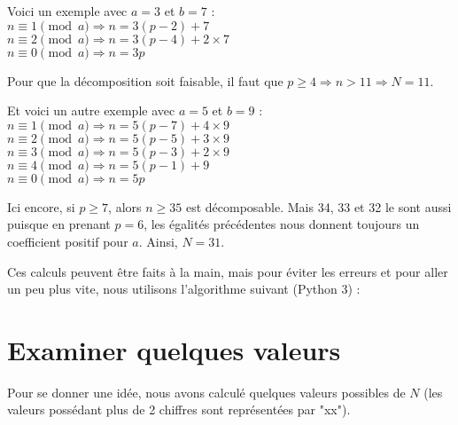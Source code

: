 \documentclass[11pt]{article}
\begin{document}
Voici un exemple avec $a = 3$ et $b = 7$ :\\
$n \equiv 1 \pmod a \Rightarrow n = 3(p - 2) + 7$ \\
$n \equiv 2 \pmod a \Rightarrow n = 3(p - 4) + 2\times 7$ \\
$n \equiv 0 \pmod a \Rightarrow n = 3p$ 

Pour que la décomposition soit faisable, il faut que $p \geq 4 \Rightarrow n > 11 \Rightarrow N = 11$.


Et voici un autre exemple avec $a = 5$ et $b = 9$ : \\
$n \equiv 1 \pmod a \Rightarrow n = 5(p - 7) + 4\times 9$ \\
$n \equiv 2 \pmod a \Rightarrow n = 5(p - 5) + 3\times 9$ \\
$n \equiv 3 \pmod a \Rightarrow n = 5(p - 3) + 2\times 9$ \\
$n \equiv 4 \pmod a \Rightarrow n = 5(p - 1) + 9$ \\
$n \equiv 0 \pmod a \Rightarrow n = 5p$ 

Ici encore, si $p \geq 7$, alors $n \geq 35$ est décomposable.
Mais 34, 33 et 32 le sont aussi puisque en prenant $p = 6$, les égalités précédentes nous donnent toujours un coefficient positif pour $a$.
Ainsi, $N = 31$.

Ces calculs peuvent être faits à la main, mais pour éviter les erreurs et pour aller un peu plus vite, nous utilisons l'algorithme suivant (Python 3) :


\section{Examiner quelques valeurs}
Pour se donner une idée, nous avons calculé quelques valeurs possibles de $N$ (les valeurs possédant plus de 2 chiffres sont représentées par "xx").
\end{document}
